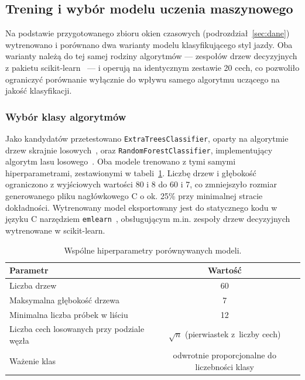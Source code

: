 \subsection{Trening i wybór modelu uczenia maszynowego}
\label{sec:trening}

Na podstawie przygotowanego zbioru okien czasowych (podrozdział~\ref{sec:dane})
wytrenowano i porównano dwa warianty modelu klasyfikującego styl jazdy. Oba
warianty należą do tej samej rodziny algorytmów --- zespołów drzew
decyzyjnych z pakietu scikit-learn~\cite{scikit-learn} --- i operują na identycznym zestawie
20 cech, co pozwoliło ograniczyć porównanie wyłącznie do wpływu samego
algorytmu uczącego na jakość klasyfikacji.

\subsubsection{Wybór klasy algorytmów}

Jako kandydatów przetestowano \texttt{ExtraTreesClassifier}, oparty na
algorytmie drzew skrajnie losowych~\cite{geurts2006}, oraz
\texttt{RandomForestClassifier}, implementujący algorytm lasu
losowego~\cite{breiman2001}. Oba modele trenowano z tymi samymi
hiperparametrami, zestawionymi w tabeli~\ref{tab:hiperparametry}. Liczbę
drzew i głębokość ograniczono z wyjściowych wartości 80 i 8 do 60 i 7, co
zmniejszyło rozmiar generowanego pliku nagłówkowego C o ok. 25\% przy
minimalnej stracie dokładności. Wytrenowany model eksportowany jest do
statycznego kodu w języku C narzędziem \texttt{emlearn}~\cite{emlearn},
obsługującym m.in. zespoły drzew decyzyjnych wytrenowane w scikit-learn.

\begin{table}[!h]
    \centering
    \caption{Wspólne hiperparametry porównywanych modeli.}
    \label{tab:hiperparametry}
    \begin{tabular}{| l | c |} \hline
        \textbf{Parametr} & \textbf{Wartość} \\ \hline\hline
        Liczba drzew                                & 60 \\ \hline
        Maksymalna głębokość drzewa                  & 7 \\ \hline
        Minimalna liczba próbek w liściu              & 12 \\ \hline
        Liczba cech losowanych przy podziale węzła     & $\sqrt{n}$ (pierwiastek z~liczby cech) \\ \hline
        Ważenie klas                                  & odwrotnie proporcjonalne do liczebności klasy \\ \hline
    \end{tabular}
\end{table}

